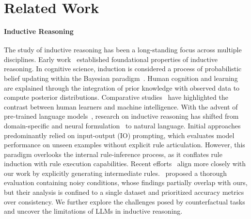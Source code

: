 \section{Related Work}
\paragraph{Inductive Reasoning} The study of inductive reasoning has been a long-standing focus across multiple disciplines. Early work~\cite{Heit2000} established foundational properties of inductive reasoning. In cognitive science, induction is considered a process of probabilistic belief updating within the Bayesian paradigm~\cite{doi:10.1126/science.1192788}. Human cognition and learning are explained through the integration of prior knowledge with observed data to compute posterior distributions. Comparative studies~\cite{doi:10.1126/science.aab3050,Lake_Ullman_Tenenbaum_Gershman_2017} have highlighted the contrast between human learners and machine intelligence.
With the advent of pre-trained language models~\cite{brown2020language}, research on inductive reasoning has shifted from domain-specific and neural formulation~\cite{tian2020learning,odena2021bustlebottomupprogramsynthesis,SABLEMEYER2022101527} to natural language. Initial approaches~\cite{pmlr-v139-alet21a,ijcai2024p693,mirchandani2023large,yang-etal-2024-language} predominantly relied on input-output (IO) prompting, which evaluates model performance on unseen examples without explicit rule articulation. However, this paradigm overlooks the internal rule-inference process, as it conflates rule induction with rule execution capabilities. Recent efforts~\cite{wang2024hypothesis} align more closely with our work by explicitly generating intermediate rules.~\citet{qiu2024phenomenal} proposed a thorough evaluation containing noisy conditions, whose findings partially overlap with ours, but their analysis is confined to a single dataset and prioritized accuracy metrics over consistency. We further explore the challenges posed by counterfactual tasks and uncover the limitations of LLMs in inductive reasoning.

